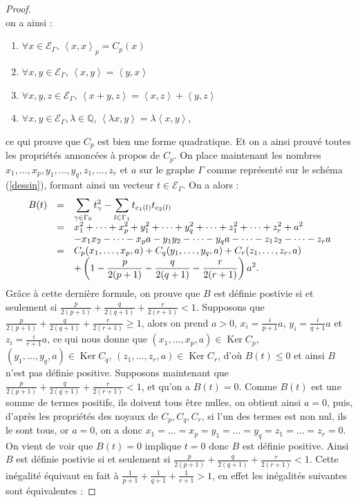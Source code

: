 \documentclass[a4paper,11pt]{article}
\DeclareMathOperator{\Ker}{Ker}
\newcommand{\ps}[2]{\left\langle#1,#2\right\rangle}
\newcommand{\EG}{\mathscr{E}_\Gamma}
\newcommand{\dps}{\displaystyle}
\begin{document}
\begin{proof}
\[	\]
on a ainsi :
\begin{enumerate}
	\item $\forall x\in\EG$, $\ps{x}{x}_p=C_p(x)$
	\item $\forall x,y\in\EG$, $\ps{x}{y}=\ps{y}{x}$
	\item $\forall x,y,z\in\EG$, $\ps{x+y}{z}=\ps{x}{z}+\ps{y}{z}$
	\item $\forall x,y\in\EG,\lambda\in\mathbb Q$, $\ps{\lambda x}{y}=\lambda\ps{x}{y}$,
\end{enumerate}
ce qui prouve que $C_p$ est bien une forme quadratique. Et on a ainsi prouvé toutes les propriétés annoncées à propos de $C_p$. On place maintenant les nombres $x_1,\dots,x_p,y_1,\dots,y_q,z_1,\dots,z_r$ et $a$ sur le graphe $\Gamma$ comme représenté sur le schéma (\ref{dessin}), formant ainsi un vecteur $t\in\EG$. On a alors :
\[
\begin{array}{>{\dps}r>{\dps}l>{\dps}l}
	B(t)&=& \sum_{\gamma\in\Gamma_0}t_\gamma^2-\sum_{l\in\Gamma_1}t_{e_1(l)}t_{e_2(l)}\\
	&=& x_1^2+\dots+x_p^2+y_1^2+\dots+y_q^2+\dots+z_1^2+\dots+z_r^2+a^2\\
	&& -x_1x_2-\dots-x_pa-y_1y_2-\dots-y_qa-\dots-z_1z_2-\dots-z_ra\\
	&=& C_p(x_1,\dots,x_p,a)+C_q(y_1,\dots,y_q,a)+C_r(z_1,\dots,z_r,a)\\
	&& +\left(1-\frac{p}{2(p+1)}-\frac{q}{2(q+1)}-\frac{r}{2(r+1)}\right)a^2.\\
\end{array}
\]
Gr\^ace à cette dernière formule, on prouve que $B$ est définie postivie si et seulement si $\frac{p}{2(p+1)}+\frac{q}{2(q+1)}+\frac{r}{2(r+1)}<1$. Supposons que $\frac{p}{2(p+1)}+\frac{q}{2(q+1)}+\frac{r}{2(r+1)}\geq1$, alors on prend $a>0$, $x_i=\frac{i}{p+1}a$, $y_i=\frac{i}{q+1}a$ et $z_i=\frac{i}{r+1}a$, ce qui nous donne que $(x_1,\dots,x_p,a)\in\Ker C_p$, $(y_1,\dots,y_q,a)\in\Ker C_q$, $(z_1,\dots,z_r,a)\in\Ker C_r$, d'où $B(t)\leq0$ et ainsi $B$ n'est pas définie positive. Supposons maintenant que $\frac{p}{2(p+1)}+\frac{q}{2(q+1)}+\frac{r}{2(r+1)}<1$, et qu'on a $B(t)=0$. Comme $B(t)$ est une somme de termes positifs, ils doivent tous être nulles, on obtient ainsi $a=0$, puis, d'après les propriétés des noyaux de $C_p,C_q,C_r$, si l'un des termes est non nul, ils le sont tous, or $a=0$, on a donc $x_1=\dots= x_p=y_1=\dots=y_q=z_1=\dots=z_r=0$. On vient de voir que $B(t)=0$ implique $t=0$ donc $B$ est définie positive. Ainsi $B$ est définie postivie si et seulement si $\frac{p}{2(p+1)}+\frac{q}{2(q+1)}+\frac{r}{2(r+1)}<1$. Cette inégalité équivaut en fait à $\frac{1}{p+1}+\frac{1}{q+1}+\frac{1}{r+1}>1$, en effet les inégalités suivantes sont équivalentes :

\end{proof}
\end{document}
